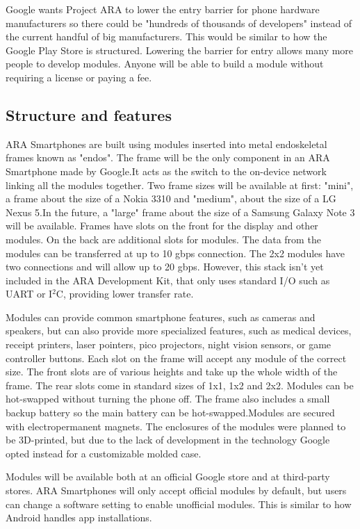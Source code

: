 Google wants Project ARA to lower the entry barrier for phone hardware manufacturers so there could be "hundreds of thousands of developers" instead of the current handful of big manufacturers. This would be similar to how the Google Play Store is structured. Lowering the barrier for entry allows many more people to develop modules. Anyone will be able to build a module without requiring a license or paying a fee.

\subsection{Structure and features}

ARA Smartphones are built using modules inserted into metal endoskeletal frames known as "endos". The frame will be the only component in an ARA Smartphone made by Google.It acts as the switch to the on-device network linking all the modules together. Two frame sizes will be available at first: "mini", a frame about the size of a Nokia 3310 and "medium", about the size of a LG Nexus 5.In the future, a "large" frame about the size of a Samsung Galaxy Note 3 will be available. Frames have slots on the front for the display and other modules. On the back are additional slots for modules. The data from the modules can be transferred at up to 10 gbps connection. The 2x2 modules have two connections and will allow up to 20 gbps. However, this stack isn't yet included in the ARA Development Kit, that only uses standard I/O such as UART or I$^2$C, providing lower transfer rate.

Modules can provide common smartphone features, such as cameras and speakers, but can also provide more specialized features, such as medical devices, receipt printers, laser pointers, pico projectors, night vision sensors, or game controller buttons. Each slot on the frame will accept any module of the correct size. The front slots are of various heights and take up the whole width of the frame. The rear slots come in standard sizes of 1x1, 1x2 and 2x2. Modules can be hot-swapped without turning the phone off. The frame also includes a small backup battery so the main battery can be hot-swapped.Modules are secured with electropermanent magnets. The enclosures of the modules were planned to be 3D-printed, but due to the lack of development in the technology Google opted instead for a customizable molded case.

Modules will be available both at an official Google store and at third-party stores. ARA Smartphones will only accept official modules by default, but users can change a software setting to enable unofficial modules. This is similar to how Android handles app installations.

